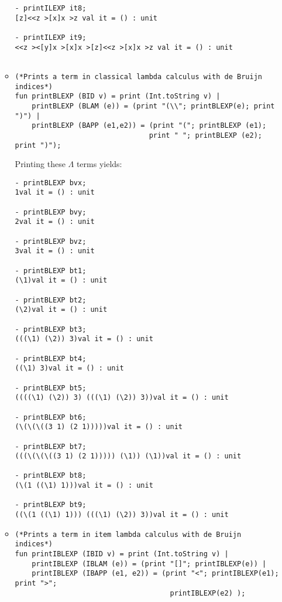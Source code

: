 \documentclass[11pt]{article}
\begin{document}
\begin{enumerate}
\begin{itemize}
\begin{verbatim}
- printILEXP it8;
[z]<<z >[x]x >z val it = () : unit

- printILEXP it9;
<<z ><[y]x >[x]x >[z]<<z >[x]x >z val it = () : unit


	      	      \end{verbatim}
	      	\item
	      	      
	      	      \begin{verbatim}
(*Prints a term in classical lambda calculus with de Bruijn indices*)
fun printBLEXP (BID v) = print (Int.toString v) |
    printBLEXP (BLAM (e)) = (print "(\\"; printBLEXP(e); print ")") |
    printBLEXP (BAPP (e1,e2)) = (print "("; printBLEXP (e1);
                                print " "; printBLEXP (e2); print ")");

	      	      \end{verbatim}  
	      	      Printing these  $\Lambda$ terms yields:
	      	      \begin{verbatim}
- printBLEXP bvx;
1val it = () : unit

- printBLEXP bvy;
2val it = () : unit

- printBLEXP bvz;
3val it = () : unit

- printBLEXP bt1;
(\1)val it = () : unit

- printBLEXP bt2;
(\2)val it = () : unit

- printBLEXP bt3;
(((\1) (\2)) 3)val it = () : unit

- printBLEXP bt4;
((\1) 3)val it = () : unit

- printBLEXP bt5;
((((\1) (\2)) 3) (((\1) (\2)) 3))val it = () : unit

- printBLEXP bt6;
(\(\(\((3 1) (2 1)))))val it = () : unit

- printBLEXP bt7;
(((\(\(\((3 1) (2 1))))) (\1)) (\1))val it = () : unit

- printBLEXP bt8;
(\(1 ((\1) 1)))val it = () : unit

- printBLEXP bt9;
((\(1 ((\1) 1))) (((\1) (\2)) 3))val it = () : unit

	      	      \end{verbatim}
	      	      
	      	      
	      	\item
	      	      \begin{verbatim}
(*Prints a term in item lambda calculus with de Bruijn indices*)
fun printIBLEXP (IBID v) = print (Int.toString v) |
    printIBLEXP (IBLAM (e)) = (print "[]"; printIBLEXP(e)) |
    printIBLEXP (IBAPP (e1, e2)) = (print "<"; printIBLEXP(e1); print ">";
                                     printIBLEXP(e2) );


\end{verbatim}
\end{itemize}
\end{enumerate}
\end{document}
